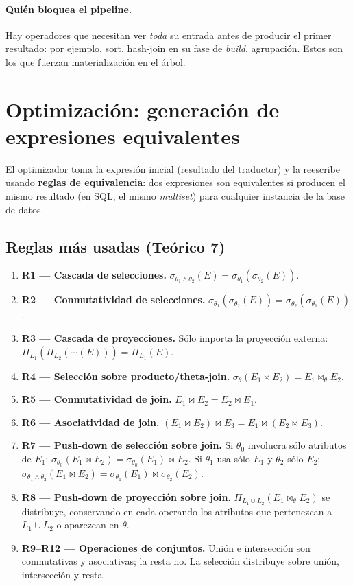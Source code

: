 \documentclass[11pt,a4paper]{article}
\newcommand{\sel}[1]{\sigma_{#1}}
\newcommand{\proy}[1]{\Pi_{#1}}
\newcommand{\jn}{\bowtie}
\begin{document}
\paragraph{Quién bloquea el pipeline.} Hay operadores que necesitan ver
\emph{toda} su entrada antes de producir el primer resultado: por ejemplo,
sort, hash-join en su fase de \emph{build}, agrupación. Estos son los que
fuerzan materialización en el árbol.

\section{Optimización: generación de expresiones equivalentes}

El optimizador toma la expresión inicial (resultado del traductor) y la
reescribe usando \textbf{reglas de equivalencia}: dos expresiones son
equivalentes si producen el mismo resultado (en SQL, el mismo \emph{multiset})
para cualquier instancia de la base de datos.

\subsection{Reglas más usadas (Teórico 7)}

\begin{enumerate}
    \item \textbf{R1 --- Cascada de selecciones.}
    $\sel{\theta_1\wedge\theta_2}(E) = \sel{\theta_1}(\sel{\theta_2}(E))$.
    \item \textbf{R2 --- Conmutatividad de selecciones.}
    $\sel{\theta_1}(\sel{\theta_2}(E)) = \sel{\theta_2}(\sel{\theta_1}(E))$.
    \item \textbf{R3 --- Cascada de proyecciones.}
    Sólo importa la proyección externa: $\proy{L_1}(\proy{L_2}(\cdots(E))) = \proy{L_1}(E)$.
    \item \textbf{R4 --- Selección sobre producto/theta-join.}
    $\sel{\theta}(E_1\times E_2) = E_1 \jn_\theta E_2$.
    \item \textbf{R5 --- Conmutatividad de join.}
    $E_1 \jn E_2 = E_2 \jn E_1$.
    \item \textbf{R6 --- Asociatividad de join.}
    $(E_1 \jn E_2) \jn E_3 = E_1 \jn (E_2 \jn E_3)$.
    \item \textbf{R7 --- Push-down de selección sobre join.}
    Si $\theta_0$ involucra sólo atributos de $E_1$:
    $\sel{\theta_0}(E_1\jn E_2) = \sel{\theta_0}(E_1)\jn E_2$.
    Si $\theta_1$ usa sólo $E_1$ y $\theta_2$ sólo $E_2$:
    $\sel{\theta_1\wedge\theta_2}(E_1\jn E_2) = \sel{\theta_1}(E_1)\jn \sel{\theta_2}(E_2)$.
    \item \textbf{R8 --- Push-down de proyección sobre join.}
    $\proy{L_1\cup L_2}(E_1\jn_\theta E_2)$ se distribuye, conservando en cada
    operando los atributos que pertenezcan a $L_1\cup L_2$ o aparezcan en
    $\theta$.
    \item \textbf{R9--R12 --- Operaciones de conjuntos.} Unión e intersección
    son conmutativas y asociativas; la resta no. La selección distribuye
    sobre unión, intersección y resta.
\end{enumerate}
\end{document}
